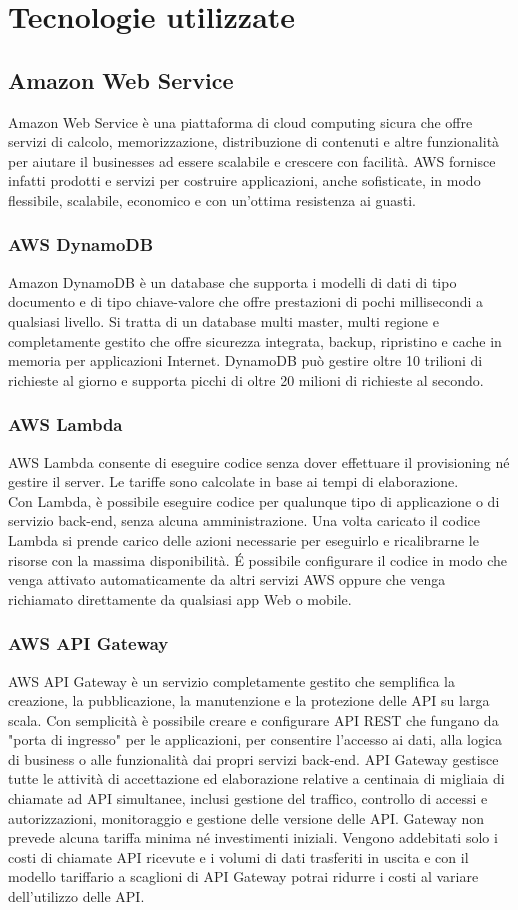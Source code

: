 \chapter{Tecnologie utilizzate}
\label{Tecnologie}
\section{Amazon Web Service}
Amazon Web Service è una piattaforma di cloud computing sicura che offre servizi di calcolo, memorizzazione, distribuzione di contenuti e altre funzionalità per aiutare il businesses ad essere scalabile e crescere con facilità. AWS fornisce infatti prodotti e servizi per costruire applicazioni, anche sofisticate, in modo flessibile, scalabile, economico e  con un'ottima resistenza ai guasti. 
\subsection{AWS DynamoDB}
Amazon DynamoDB è un database che supporta i modelli di dati di tipo documento e di tipo chiave-valore che offre prestazioni di pochi millisecondi a qualsiasi livello. Si tratta di un database multi master, multi regione e completamente gestito che offre sicurezza integrata, backup, ripristino e cache in memoria per applicazioni Internet. DynamoDB può gestire oltre 10 trilioni di richieste al giorno e supporta picchi di oltre 20 milioni di richieste al secondo. 
\subsection{AWS Lambda}
AWS Lambda consente di eseguire codice senza dover effettuare il provisioning né gestire il server. Le tariffe sono calcolate in base ai tempi di elaborazione.\\ 
Con Lambda, è possibile eseguire codice per qualunque tipo di applicazione o di servizio back-end, senza alcuna amministrazione. Una volta caricato il codice Lambda si prende carico delle azioni necessarie per eseguirlo e ricalibrarne le risorse con la massima disponibilità. \'E possibile configurare il codice in modo che venga attivato automaticamente da altri servizi AWS oppure che venga richiamato direttamente da qualsiasi app Web o mobile.
\subsection{AWS API Gateway}
AWS API Gateway è un servizio completamente gestito che semplifica la creazione, la pubblicazione, la manutenzione e la protezione delle API su larga scala. Con semplicità è possibile creare e configurare API REST che fungano da "porta di ingresso" per le applicazioni, per consentire l'accesso ai dati, alla logica di business o alle funzionalità dai propri servizi back-end. API Gateway gestisce tutte le attività di accettazione ed elaborazione relative a centinaia di migliaia di chiamate ad API simultanee, inclusi gestione del traffico, controllo di accessi e autorizzazioni, monitoraggio e gestione delle versione delle API. Gateway non prevede alcuna tariffa minima né investimenti iniziali. Vengono addebitati solo i costi di chiamate API ricevute e i volumi di dati trasferiti in uscita e con il modello tariffario a scaglioni di API Gateway potrai ridurre i costi al variare dell'utilizzo delle API.
